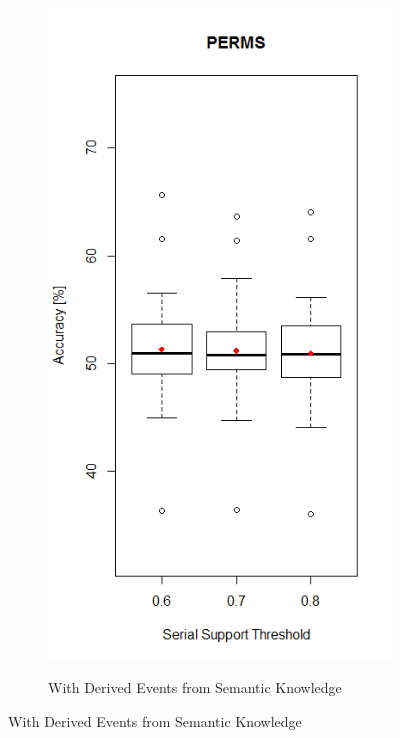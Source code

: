 \begin{figure}[h]
\centering
\begin{subfigure}{.5\textwidth}
  \centering
  \includegraphics[width=\linewidth]{permsSupportSerialWithSemantic}
  \label{fig_permsSupportSerialWithSemantic}
  \caption{With Derived Events from Semantic Knowledge}
\end{subfigure}%

\end{figure}
